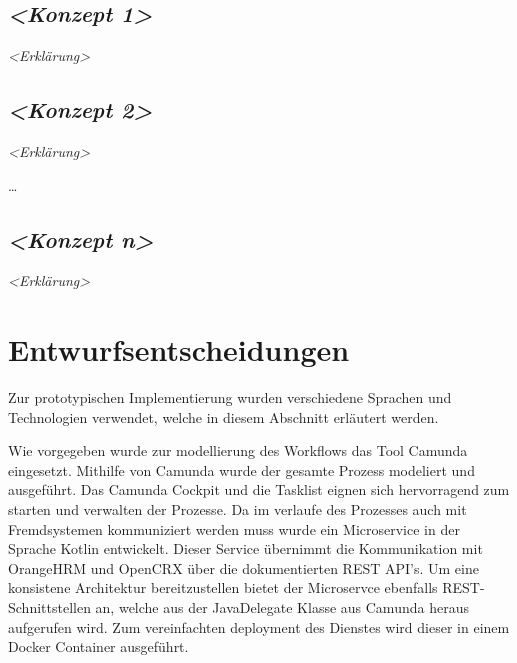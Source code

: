 \documentclass[]{article}
\begin{document}
\hypertarget{__emphasis_konzept_1_emphasis}{%
\subsection{\texorpdfstring{\emph{\textless{}Konzept
1\textgreater{}}}{\textless{}Konzept 1\textgreater{}}}\label{__emphasis_konzept_1_emphasis}}

\emph{\textless{}Erklärung\textgreater{}}

\hypertarget{__emphasis_konzept_2_emphasis}{%
\subsection{\texorpdfstring{\emph{\textless{}Konzept
2\textgreater{}}}{\textless{}Konzept 2\textgreater{}}}\label{__emphasis_konzept_2_emphasis}}

\emph{\textless{}Erklärung\textgreater{}}

\ldots{}

\hypertarget{__emphasis_konzept_n_emphasis}{%
\subsection{\texorpdfstring{\emph{\textless{}Konzept
n\textgreater{}}}{\textless{}Konzept n\textgreater{}}}\label{__emphasis_konzept_n_emphasis}}

\emph{\textless{}Erklärung\textgreater{}}

\hypertarget{section-design-decisions}{%
\section{Entwurfsentscheidungen}\label{section-design-decisions}}

Zur prototypischen Implementierung wurden verschiedene Sprachen und Technologien verwendet, welche in diesem Abschnitt erläutert werden.

Wie vorgegeben wurde zur modellierung des Workflows das Tool Camunda eingesetzt. Mithilfe von Camunda wurde der gesamte Prozess modeliert und ausgeführt. Das Camunda Cockpit und die Tasklist eignen sich hervorragend zum starten und verwalten der Prozesse. 
Da im verlaufe des Prozesses auch mit Fremdsystemen kommuniziert werden muss wurde ein Microservice in der Sprache Kotlin entwickelt. Dieser Service übernimmt die Kommunikation mit OrangeHRM und OpenCRX über die dokumentierten REST API's.
Um eine konsistene Architektur bereitzustellen bietet der Microservce ebenfalls REST-Schnittstellen an, welche aus der JavaDelegate Klasse aus Camunda heraus aufgerufen wird. 
Zum vereinfachten deployment des Dienstes wird dieser in einem Docker Container ausgeführt.
\end{document}
